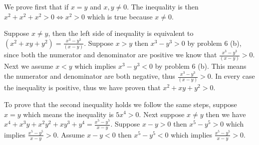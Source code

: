 \begin{problem} %
\end{problem}

\begin{problem} %
	We prove first that if $x=y$ and $x,y\neq 0$. The inequality is then $x^2+x^2+x^2>0 \iff x^2 >0$ which is true because $x\neq 0$.
	
	Suppose $x\neq y$, then the left side of inequality is equivalent to $(x^2+xy+y^2)=\frac{x^3-y^3}{(x-y)}$. Suppose $x>y$ then $x^3-y^3>0$ by problem 6 (b),  since both the numerator and denominator are positive we know that $\frac{x^3-y^3}{(x-y)}>0$. Next we assume $x < y$ which implies $x^3-y^3 < 0$ by problem 6 (b). This means the numerator and denominator are both negative, thus $\frac{x^3-y^3}{(x-y)}>0$. In every case the inequality is positive, thus we have proven that $x^2+xy+y^2>0$.
	
	To prove that the second inequality holds we follow the same steps, suppose $x=y$ which means the inequality is $5x^4>0$. Next suppose $x\neq y$ then we have $x^4+x^3y+x^2y^2+xy^3+y^4=\frac{x^5-y^5}{x-y}$. Suppose $x-y>0$ then $x^5-y^5>0$ which implies $\frac{x^5-y^5}{x-y}>0$. Assume $x-y<0$ then $x^5-y^5<0$ which implies $\frac{x^5-y^5}{x-y}>0$.
\end{problem}

\begin{hproblem} %
\end{hproblem}